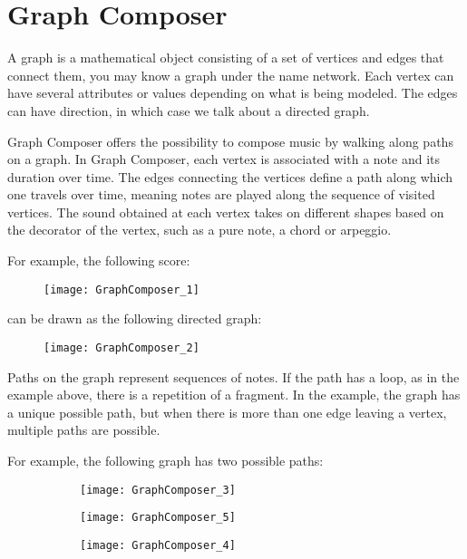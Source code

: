 \section{Graph Composer}
A graph is a mathematical object consisting of a set of vertices and edges that connect them, you may know a graph under the name network. Each vertex can have several attributes or values depending on what is being modeled. The edges can have direction, in which case we talk about a directed graph.

Graph Composer offers the possibility to compose music by walking along paths on a graph. In Graph Composer, each vertex is associated with a note and its duration over time. The edges connecting the vertices define a path along which one travels over time, meaning notes are played along the sequence of visited vertices. The sound obtained at each vertex takes on different shapes based on the decorator of the vertex, such as a pure note, a chord or arpeggio.

For example, the following score:
\begin{figure}[h]
\centering
\texttt{[image: GraphComposer\_1]}
\end{figure}

can be drawn as the following directed graph:
\begin{figure}[h]
\centering
\texttt{[image: GraphComposer\_2]}
\end{figure}

Paths on the graph represent sequences of notes. If the path has a loop, as in the example above, there is a repetition of a fragment. In the example, the graph has a unique possible path, but when there is more than one edge leaving a vertex, multiple paths are possible. 

For example, the following graph has two possible paths:

\begin{figure}[h]
\centering
\begin{subfigure}{0.45\textwidth}
\centering
\texttt{[image: GraphComposer\_3]}
\end{subfigure}

\begin{subfigure}{0.45\textwidth}
\centering
\texttt{[image: GraphComposer\_5]}
\end{subfigure}
\begin{subfigure}{0.45\textwidth}
\centering
\texttt{[image: GraphComposer\_4]}
\end{subfigure}
\end{figure}

